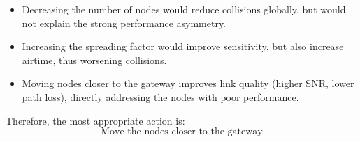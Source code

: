 \documentclass[a4paper,12pt]{article}
\begin{document}
\begin{itemize}
    \item Decreasing the number of nodes would reduce collisions globally, but would not explain the strong performance asymmetry.
    \item Increasing the spreading factor would improve sensitivity, but also increase airtime, thus worsening collisions.
    \item Moving nodes closer to the gateway improves link quality (higher SNR, lower path loss), directly addressing the nodes with poor performance.
\end{itemize}

Therefore, the most appropriate action is:
\[
\boxed{\text{Move the nodes closer to the gateway}}
\]
\end{document}
